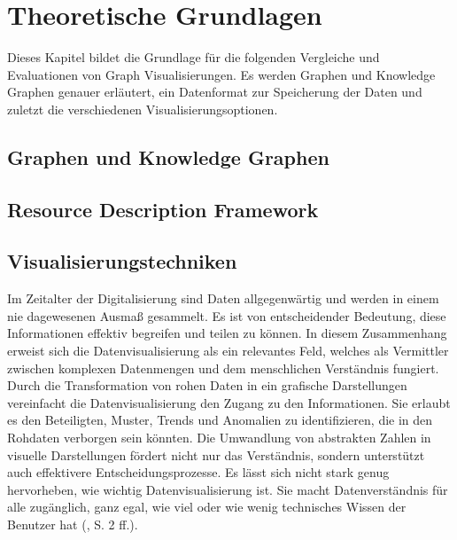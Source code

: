 
\chapter{Theoretische Grundlagen}

Dieses Kapitel bildet die Grundlage für die folgenden Vergleiche und Evaluationen von Graph Visualisierungen. Es werden Graphen und Knowledge Graphen genauer erläutert, ein Datenformat zur Speicherung der Daten und zuletzt die verschiedenen Visualisierungsoptionen. 

\section{Graphen und Knowledge Graphen}

\section{Resource Description Framework}

\section{Visualisierungstechniken}

Im Zeitalter der Digitalisierung sind Daten allgegenwärtig und werden in einem nie dagewesenen Ausmaß gesammelt. Es ist von entscheidender Bedeutung, diese Informationen effektiv begreifen und teilen zu können. In diesem Zusammenhang erweist sich die Datenvisualisierung als ein relevantes Feld, welches als Vermittler zwischen komplexen Datenmengen und dem menschlichen Verständnis fungiert. Durch die Transformation von rohen Daten in ein grafische Darstellungen vereinfacht die Datenvisualisierung den Zugang zu den Informationen. Sie erlaubt es den Beteiligten, Muster, Trends und Anomalien zu identifizieren, die in den Rohdaten verborgen sein könnten. Die Umwandlung von abstrakten Zahlen in visuelle Darstellungen fördert nicht nur das Verständnis, sondern unterstützt auch effektivere Entscheidungsprozesse. Es lässt sich nicht stark genug hervorheben, wie wichtig Datenvisualisierung ist. Sie macht Datenverständnis für alle zugänglich, ganz egal, wie viel oder wie wenig technisches Wissen der Benutzer hat (\cite{unwin:WhyDataVisualization}, S. 2 ff.).

